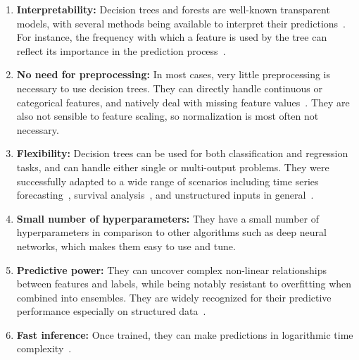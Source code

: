 \begin{itemize}
\begin{enumerate}
    \item \textbf{Interpretability:} Decision trees and forests are well-known transparent models, with several methods being available to interpret their predictions~\cite{mdi, mdi+, treeshap}. For instance, the frequency with which a feature is used by the tree can reflect its importance in the prediction process~\cite{breiman1984classification}.
    \item \textbf{No need for preprocessing:} In most cases, very little preprocessing is necessary to use decision trees. They can directly handle continuous or categorical features, and natively deal with missing feature values~\cite{xgboost}. They are also not sensible to feature scaling, so normalization is most often not necessary.
    \item \textbf{Flexibility:} Decision trees can be used for both classification and regression tasks, and can handle either single or multi-output problems. They were successfully adapted to a wide range of scenarios including time series forecasting~\cite{}, survival analysis~\cite{}, and unstructured inputs in general~\cite{zhang2017deepforest}.
    \item \textbf{Small number of hyperparameters:}
    They have a small number of hyperparameters in comparison to other algorithms such as deep neural networks, which makes them easy to use and tune. 
    \item \textbf{Predictive power:} They can uncover complex non-linear relationships between features and labels, while being notably resistant to overfitting when combined into ensembles. They are widely recognized for their predictive performance especially on structured data~\cite{whyarebestfortabular}.
    \item \textbf{Fast inference:} Once trained, they can make predictions in logarithmic time complexity~\cite{breiman1984classification}.
\end{enumerate}


\end{itemize}
